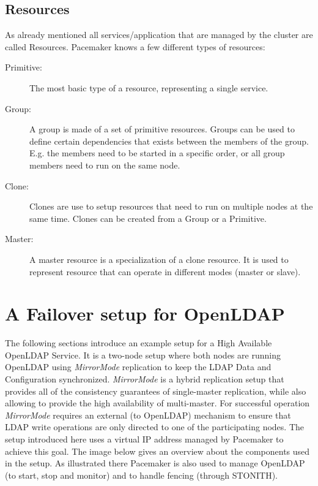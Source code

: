 \documentclass[a4paper,11pt,DIV=12]{scrartcl}
\begin{document}
\subsection{Resources}
    As already mentioned all services/application that are managed by the
    cluster are called Resources. Pacemaker knows a few different types of
    resources:
    \begin{description}
        \item[Primitive:]
            The most basic type of a resource, representing a single service.
        \item[Group:]
            A group is made of a set of primitive resources. Groups can be
            used to define certain dependencies that exists between the
            members of the group. E.g. the members need to be started in a
            specific order, or all group members need to run on the same node.
        \item[Clone:]
            Clones are use to setup resources that need to run on multiple
            nodes at the same time. Clones can be created from a Group or
            a Primitive.
        \item[Master:]
            A master resource is a specialization of a clone resource. It is
            used to represent resource that can operate in different modes
            (master or slave).
    \end{description}

\section{A Failover setup for OpenLDAP}
    The following sections introduce an example setup for a High Available
    OpenLDAP Service. It is a two-node setup where both nodes are running
    OpenLDAP using \emph{MirrorMode} replication to keep the LDAP Data and
    Configuration synchronized.  \emph{MirrorMode} is a hybrid
    replication setup that provides all of the consistency guarantees of
    single-master replication, while also allowing to provide the high
    availability of multi-master\cite{adming}. For successful operation
    \emph{MirrorMode} requires an external (to OpenLDAP) mechanism to ensure
    that LDAP write operations are only directed to one of the participating
    nodes. The setup introduced here uses a virtual IP address managed by
    Pacemaker to achieve this goal. The image below gives an overview about the
    components used in the setup. As illustrated there Pacemaker is also used
    to manage OpenLDAP (to start, stop and monitor) and to handle fencing
    (through STONITH).
\end{document}

